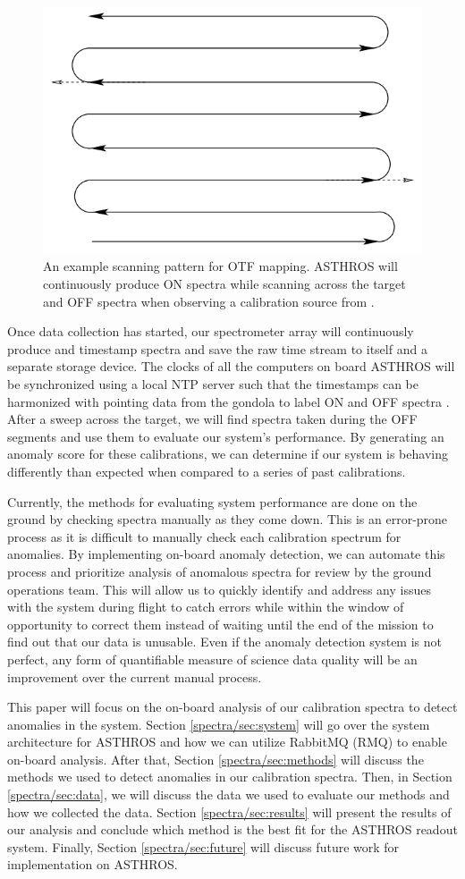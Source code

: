 \begin{figure}
    \centering
    \includegraphics[width=0.5\linewidth]{figs/spectra/scan.png}
    \caption{An example scanning pattern for OTF mapping. ASTHROS will continuously produce ON spectra while scanning across the target and OFF spectra when observing a calibration source from \parencite{mangum2007fly}.}
    \label{spectra/fig:scan}
\end{figure}

Once data collection has started, our spectrometer array will continuously produce and timestamp spectra and save the raw time stream to itself and a separate storage device. 
The clocks of all the computers on board ASTHROS will be synchronized using a local NTP server such that the timestamps can be harmonized with pointing data from the gondola to label ON and OFF spectra \parencite{mills1991internet}.
After a sweep across the target, we will find spectra taken during the OFF segments and use them to evaluate our system's performance.
By generating an anomaly score for these calibrations, we can determine if our system is behaving differently than expected when compared to a series of past calibrations.

Currently, the methods for evaluating system performance are done on the ground by checking spectra manually as they come down.
This is an error-prone process as it is difficult to manually check each calibration spectrum for anomalies.
By implementing on-board anomaly detection, we can automate this process and prioritize analysis of anomalous spectra for review by the ground operations team.
This will allow us to quickly identify and address any issues with the system during flight to catch errors while within the window of opportunity to correct them instead of waiting until the end of the mission to find out that our data is unusable.
Even if the anomaly detection system is not perfect, any form of quantifiable measure of science data quality will be an improvement over the current manual process.


This paper will focus on the on-board analysis of our calibration spectra to detect anomalies in the system.
Section \ref{spectra/sec:system} will go over the system architecture for ASTHROS and how we can utilize RabbitMQ (RMQ) to enable on-board analysis.
After that, Section \ref{spectra/sec:methods} will discuss the methods we used to detect anomalies in our calibration spectra.
Then, in Section \ref{spectra/sec:data}, we will discuss the data we used to evaluate our methods and how we collected the data.
Section \ref{spectra/sec:results} will present the results of our analysis and conclude which method is the best fit for the ASTHROS readout system.
Finally, Section \ref{spectra/sec:future} will discuss future work for implementation on ASTHROS. 

